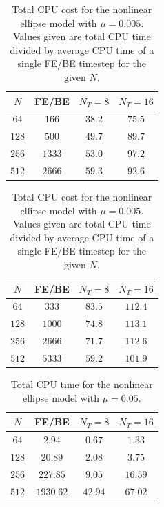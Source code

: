 \documentclass[preprint,12pt]{elsarticle}
\begin{document}
\begin{table}
\caption{Total CPU cost for the nonlinear ellipse model with $\mu=0.05$. Values given are total CPU time divided by average CPU time of a single FE/BE timestep for the given $N$.}
\label{table:NonlinearEllipseSims_05Fluids}
\begin{center}
\begin{tabular}{|c|c| c c|}
\hline
$N$ & FE/BE & $N_T = 8$ & $N_T = 16$\\
\hline
$64$ & $166$ & $38.2$ & $75.5$ \\
$128$ & $500$ & $49.7$ & $89.7$ \\
$256$ & $1333$ & $53.0$ & $97.2$ \\
$512$ & $2666$ & $59.3$ & $92.6$ \\
\hline
\end{tabular}
\end{center}

\caption{Total CPU cost for the nonlinear ellipse model with $\mu=0.005$. Values given are total CPU time divided by average CPU time of a single FE/BE timestep for the given $N$.}
\label{table:NonlinearEllipseSims_005Fluids}
\begin{center}
\begin{tabular}{|c|c| c c|}
\hline
$N$ & FE/BE & $N_T = 8$ & $N_T = 16$\\
\hline
$64$ & $333$ & $83.5$ & $112.4$ \\
$128$ & $1000$ & $74.8$ & $113.1$ \\
$256$ & $2666$ & $71.7$ & $112.6$ \\
$512$ & $5333$ & $59.2$ & $101.9$ \\
\hline
\end{tabular}
\end{center}
\end{table}

\begin{table}
\caption{Total CPU time for the nonlinear ellipse model with $\mu=0.05$.}
\label{table:NonlinearEllipseSims_05CPU}
\begin{center}
\begin{tabular}{|c|c| c c|}
\hline
$N$ & FE/BE & $N_T = 8$ & $N_T = 16$\\
\hline
$64$ & $2.94$ & $0.67$ & $1.33$ \\
$128$ & $20.89$ & $2.08$ & $3.75$ \\
$256$ & $227.85$ & $9.05$ & $16.59$ \\
$512$ & $1930.62$ & $42.94$ & $67.02$ \\
\hline
\end{tabular}
\end{center}
\end{table}
\end{document}
